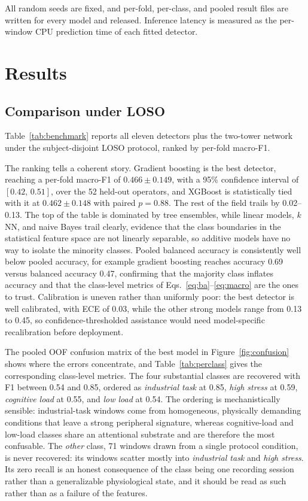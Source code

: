 \documentclass{llncs}
\begin{document}
All random seeds are fixed, and per-fold, per-class, and pooled result files are
written for every model and released. Inference latency is measured as the per-window CPU
prediction time of each fitted detector.

\section{Results}
\label{sec:results}

\subsection{Comparison under \ac{LOSO}}

Table~\ref{tab:benchmark} reports all eleven detectors plus the two-tower network
under the subject-disjoint \ac{LOSO} protocol, ranked by per-fold macro-F1.



The ranking tells a coherent story. Gradient boosting is the best detector, reaching a
per-fold macro-F1 of $0.466 \pm 0.149$, with a 95\% confidence interval of
$[0.42,\,0.51]$, over the 52 held-out operators, and \ac{XGBoost} is statistically
tied with it at $0.462 \pm 0.148$ with paired $p = 0.88$. The rest of the field trails
by 0.02--0.13. The top of the table is
dominated by tree ensembles, while linear models, $k$NN, and naive Bayes trail
clearly, evidence that the class boundaries in the statistical feature space are not
linearly separable, so additive models have no way to isolate the minority classes.
Pooled balanced accuracy is consistently well below pooled accuracy, for example
gradient boosting reaches accuracy 0.69 versus balanced accuracy 0.47, confirming
that the majority
class inflates accuracy and that the class-level metrics of
Eqs.~\eqref{eq:ba}--\eqref{eq:macro} are the ones to trust. Calibration is uneven
rather than uniformly poor: the best detector is well calibrated, with \ac{ECE} of
$0.03$, while the other strong models range from 0.13 to 0.45, so
confidence-thresholded assistance would need model-specific recalibration before
deployment.

The pooled \ac{OOF} confusion matrix of the best model in
Figure~\ref{fig:confusion} shows where the errors concentrate, and
Table~\ref{tab:perclass} gives the corresponding class-level metrics. The four
substantial classes are recovered with \ac{F1} between 0.54 and 0.85, ordered as
\emph{industrial task} at 0.85, \emph{high stress} at 0.59, \emph{cognitive load} at
0.55, and \emph{low load} at 0.54. The ordering is
mechanistically sensible: industrial-task windows come from homogeneous, physically
demanding conditions that leave a strong peripheral signature, whereas cognitive-load
and low-load classes share an attentional substrate and are therefore the most
confusable. The \emph{other} class, 71 windows drawn from a single protocol
condition, is never recovered: its windows scatter mostly into \emph{industrial
task} and \emph{high stress}. Its zero recall is an honest consequence of the class
being one recording session rather than a generalizable physiological state, and it
should be read as such rather than as a failure of the features.
\end{document}
